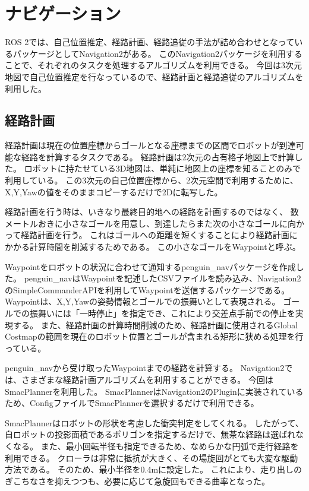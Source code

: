 \section{ナビゲーション}
ROS 2では、自己位置推定、経路計画、経路追従の手法が詰め合わせとなっているパッケージとしてNavigation2\cite{macenski2020marathon2}がある。
このNavigation2パッケージを利用することで、それぞれのタスクを処理するアルゴリズムを利用できる。
今回は3次元地図で自己位置推定を行なっているので、経路計画と経路追従のアルゴリズムを利用した。

\subsection{経路計画}
経路計画は現在の位置座標からゴールとなる座標までの区間でロボットが到達可能な経路を計算するタスクである。
経路計画は2次元の占有格子地図上で計算した。
ロボットに持たせている3D地図は、単純に地図上の座標を知ることのみで利用している。
この3次元の自己位置座標から、2次元空間で利用するために、X,Y,Yawの値をそのままコピーするだけで2Dに転写した。

経路計画を行う時は、いきなり最終目的地への経路を計画するのではなく、
数メートルおきに小さなゴールを用意し、到達したらまた次の小さなゴールに向かって経路計画を行う。
これはゴールへの距離を短くすることにより経路計画にかかる計算時間を削減するためである。
この小さなゴールをWaypointと呼ぶ。

Waypointをロボットの状況に合わせて通知するpenguin\_navパッケージ\cite{penguinnav}を作成した。
penguin\_navはWaypointを記述したCSVファイルを読み込み、Navigation2のSimpleCommanderAPIを利用してWaypointを送信するパッケージである。
Waypointは、X,Y,Yawの姿勢情報とゴールでの振舞いとして表現される。
ゴールでの振舞いには「一時停止」を指定でき、これにより交差点手前での停止を実現する。
また、経路計画の計算時間削減のため、経路計画に使用されるGlobal Costmapの範囲を現在のロボット位置とゴールが含まれる矩形に狭める処理を行っている。

penguin\_navから受け取ったWaypointまでの経路を計算する。
Navigation2では、さまざまな経路計画アルゴリズムを利用することができる。
今回はSmacPlanner\cite{macenski2024smac}を利用した。
SmacPlannerはNavigation2のPluginに実装されているため、ConfigファイルでSmacPlannerを選択するだけで利用できる。

SmacPlannerはロボットの形状を考慮した衝突判定をしてくれる。
したがって、自ロボットの投影面積であるポリゴンを指定するだけで、無茶な経路は選ばれなくなる。
また、最小回転半径も指定できるため、なめらかな円弧で走行経路を利用できる。
クローラは非常に抵抗が大きく、その場旋回がとても大変な駆動方法である。
そのため、最小半径を0.4mに設定した。
これにより、走り出しのぎこちなさを抑えつつも、必要に応じて急旋回もできる曲率となった。

